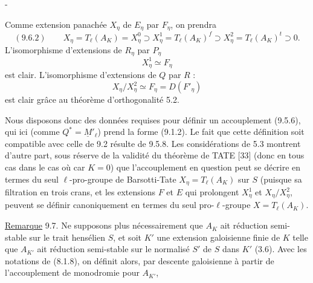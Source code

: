 \begin{center}- \end{center}

Comme extension panachée $X_\eta$ de $E_\eta$ par $F_\eta$, on prendra
\[
(9.6.2)\qquad X_\eta=T_\ell(A_K)=X_\eta^0\supset X_\eta^1=T_\ell(A_K)^f\supset X_\eta^2=T_\ell(A_K)^t\supset0.
\]
L'isomorphisme d'extensions de $R_\eta$ par $P_\eta$
\[
 X_\eta^1\simeq F_\eta
\]
est clair. L'isomorphisme d'extensions de $Q$ par $R$ :
\[
 X_\eta/X_\eta^2\simeq F_\eta=D(F'_\eta)
\]
est clair grâce au théorème d'orthogonalité 5.2.

Nous disposons donc des données requises pour définir un accouplement (9.5.6), qui ici (comme $Q^*=\underline M'_\ell$) prend la forme (9.1.2). Le fait que cette définition soit compatible avec celle de 9.2 résulte de 9.5.8. Les considérations de 5.3 montrent d'autre part, sous réserve de la validité du théorème de TATE [33] (donc en tous cas dans le cas où car $K=0$) que l'accouplement en question peut se décrire en termes du seul $\ell$-pro-groupe de Barsotti-Tate $X_\eta=T_\ell(A_K)$ sur $S$ (puisque sa filtration en trois crans, et les extensions $F$ et $E$ qui prolongent $X_\eta^1$ et $X_\eta/X_\eta^2$, peuvent se définir canoniquement en termes du seul pro-$\ell$-groupe $X=T_\ell(A_K)$.

\uline{Remarque} 9.7. Ne supposons plus nécessairement que $A_K$ ait réduction semi-stable sur le trait hensélien $S$, et soit $K'$ une extension galoisienne finie de $K$ telle que $A_{K'}$ ait réduction semi-stable sur le normalisé $S'$ de $S$ dans $K'$ (3.6). Avec les notations de (8.1.8), on définit alors, par descente galoisienne à partir de l'accouplement de monodromie pour $A_{K'}$,

